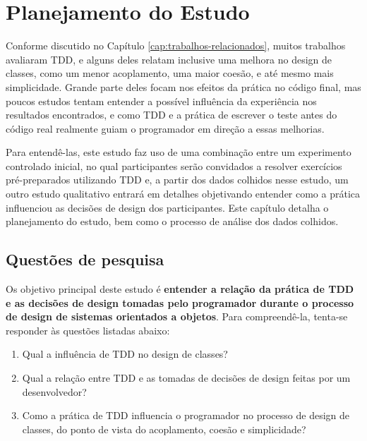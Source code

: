 \chapter{Planejamento do Estudo}
\label{cap:planejamento}

Conforme discutido no Capítulo \ref{cap:trabalhos-relacionados}, muitos 
trabalhos avaliaram TDD, e alguns deles relatam inclusive uma melhora
no design de classes, como um menor acoplamento, uma maior coesão, e até mesmo
mais simplicidade. 
Grande parte deles focam nos efeitos da prática
no código final, mas poucos estudos tentam entender a possível influência da experiência
nos resultados encontrados, e como TDD e a
prática de escrever o teste antes do código real realmente guiam o programador 
em direção a essas melhorias.

Para entendê-las, este estudo faz uso de uma combinação entre um experimento controlado inicial, no qual participantes serão
convidados a resolver exercícios pré-preparados utilizando TDD e, a partir dos dados colhidos nesse estudo, um outro
estudo qualitativo entrará em detalhes objetivando entender como a prática influenciou as decisões de design dos participantes.
Este capítulo detalha o planejamento do estudo, 
bem como o processo de análise dos dados colhidos.

\section{Questões de pesquisa}

Os objetivo principal deste estudo é \textbf{entender a relação da prática de TDD 
e as decisões de design tomadas pelo programador durante o processo de 
design de sistemas orientados a objetos}.
Para compreendê-la, tenta-se responder às questões listadas
abaixo:

\begin{enumerate}

	\item Qual a influência de TDD no design de classes?

	\item Qual a relação entre TDD e as tomadas de decisões de design
	feitas por um desenvolvedor?

	\item Como a prática de TDD influencia o programador no processo de  
	design de classes, do ponto de vista do acoplamento, coesão e simplicidade?

\end{enumerate}

